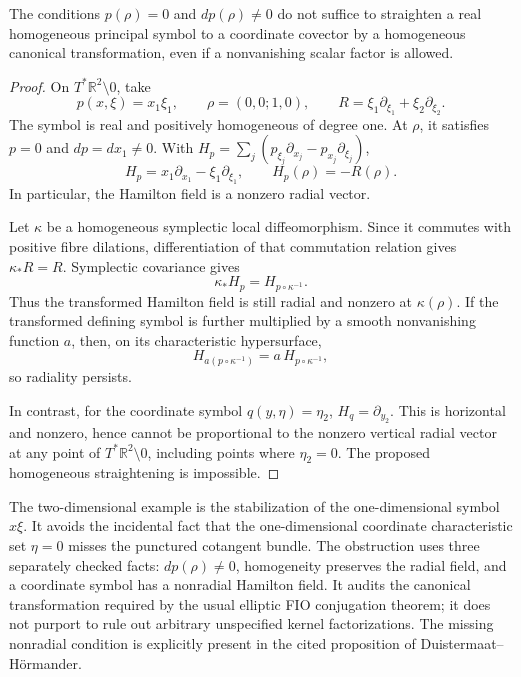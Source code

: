 \begin{proposition}\ours
The conditions \(p(\rho)=0\) and \(dp(\rho)\ne0\) do not suffice to
straighten a real homogeneous principal symbol to a coordinate covector
by a homogeneous canonical transformation, even if a nonvanishing
scalar factor is allowed.
\end{proposition}

\begin{proof}
On \(T^*\mathbb R^2\setminus0\), take
\[
 p(x,\xi)=x_1\xi_1,\qquad
 \rho=(0,0;1,0),\qquad
 R=\xi_1\partial_{\xi_1}+\xi_2\partial_{\xi_2}.
\]
The symbol is real and positively homogeneous of degree one.
At \(\rho\), it satisfies \(p=0\) and \(dp=dx_1\ne0\).
With
\(H_p=\sum_j(p_{\xi_j}\partial_{x_j}-p_{x_j}\partial_{\xi_j})\),
\[
 H_p=x_1\partial_{x_1}-\xi_1\partial_{\xi_1},
 \qquad H_p(\rho)=-R(\rho).
\]
In particular, the Hamilton field is a nonzero radial vector.

Let \(\kappa\) be a homogeneous symplectic local diffeomorphism. Since it
commutes with positive fibre dilations, differentiation of that
commutation relation gives \(\kappa_*R=R\). Symplectic covariance gives
\[
 \kappa_*H_p=H_{p\circ\kappa^{-1}}.
\]
Thus the transformed Hamilton field is still radial and nonzero at
\(\kappa(\rho)\). If the transformed defining symbol is further
multiplied by a smooth nonvanishing function \(a\), then, on its
characteristic hypersurface,
\[
 H_{a(p\circ\kappa^{-1})}
   =a\,H_{p\circ\kappa^{-1}},
\]
so radiality persists.

In contrast, for the coordinate symbol \(q(y,\eta)=\eta_2\),
\(H_q=\partial_{y_2}\). This is horizontal and nonzero, hence cannot
be proportional to the nonzero vertical radial vector at any
point of \(T^*\mathbb R^2\setminus0\), including points where
\(\eta_2=0\). The proposed homogeneous straightening is impossible.
\end{proof}

\begin{remark}
The two-dimensional example is the stabilization of the one-dimensional
symbol \(x\xi\). It avoids the incidental fact that the one-dimensional
coordinate characteristic set \(\eta=0\) misses the punctured cotangent
bundle. The obstruction uses three separately checked facts:
\(dp(\rho)\ne0\), homogeneity preserves the radial field, and a coordinate
symbol has a nonradial Hamilton field. It audits the canonical
transformation required by the usual elliptic FIO conjugation theorem;
it does not purport to rule out arbitrary unspecified kernel
factorizations. The missing nonradial condition is explicitly present
in the cited proposition of Duistermaat--Hörmander.
\end{remark}

